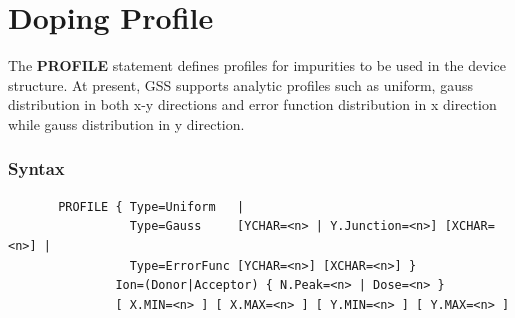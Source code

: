 \documentclass[11pt,pdftex]{article}
\begin{document}
\newpage
\section{Doping Profile}
The \textbf{PROFILE} statement defines profiles for impurities to be
used in the device structure. At present, GSS supports analytic
profiles such as uniform, gauss distribution in both x-y directions
and error function distribution in x direction while gauss
distribution in y direction.

\subsubsection*{Syntax}
\begin{verbatim}
       PROFILE { Type=Uniform   |
                 Type=Gauss     [YCHAR=<n> | Y.Junction=<n>] [XCHAR=<n>] |
                 Type=ErrorFunc [YCHAR=<n>] [XCHAR=<n>] }
               Ion=(Donor|Acceptor) { N.Peak=<n> | Dose=<n> }
               [ X.MIN=<n> ] [ X.MAX=<n> ] [ Y.MIN=<n> ] [ Y.MAX=<n> ]
\end{verbatim}
\end{document}

